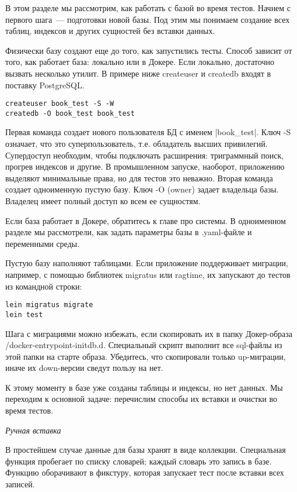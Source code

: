 В этом разделе мы рассмотрим, как работать с базой во время тестов. Начнем с
первого шага~--- подготовки новой базы. Под этим мы понимаем создание всех таблиц,
индексов и других сущностей без вставки данных.

Физически базу создают еще до того, как запустились тесты. Способ зависит от
того, как работает база: локально или в Докере. Если локально, достаточно
вызвать несколько утилит. В примере ниже createuser и createdb входят в поставку
PostgreSQL.

\begin{verbatim}
createuser book_test -S -W
createdb -O book_test book_test
\end{verbatim}

Первая команда создает нового пользователя БД с именем \spverb|book_test|. Ключ -S
означает, что это суперпользователь, т.е. обладатель высших
привилегий. Супердоступ необходим, чтобы подключать расширения: триграммный
поиск, прогрев индексов и другие. В промышленном запуске, наоборот, приложению
выделяют минимальные права, но для тестов это неважно. Вторая команда создает
одноименную пустую базу. Ключ -O (owner) задает владельца базы. Владелец имеет
полный доступ ко всем ее сущностям.

Если база работает в Докере, обратитесь к главе про системы. В одноименном
разделе мы рассмотрели, как задать параметры базы в .yaml-файле и переменными
среды.

Пустую базу наполняют таблицами. Если приложение поддерживает миграции,
например, с помощью библиотек migratus или ragtime, их запускают до тестов из
командной строки:

\begin{verbatim}
lein migratus migrate
lein test
\end{verbatim}

Шага с миграциями можно избежать, если скопировать их в папку Докер-образа
/docker-entrypoint-initdb.d. Специальный скрипт выполнит все sql-файлы из этой
папки на старте образа. Убедитесь, что скопировали только up-миграции, иначе их
down-версии сведут пользу на нет.

К этому моменту в базе уже созданы таблицы и индексы, но нет данных. Мы
переходим к основной задаче: перечислим способы их вставки и очистки во время
тестов.

\emph{Ручная вставка}

В простейшем случае данные для базы хранят в виде коллекции. Специальная функция
пробегает по списку словарей; каждый словарь это запись в базе. Функцию
оборачивают в фикстуру, которая запускает тест после вставки всех записей.

